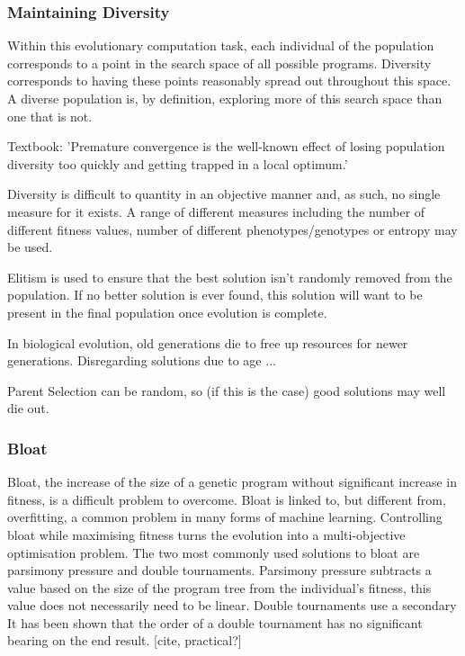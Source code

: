 \documentclass{article}
\begin{document}

\subsubsection{Maintaining Diversity}
Within this evolutionary computation task, each individual of the population corresponds to a point in the search space of all possible programs. %
Diversity corresponds to having these points reasonably spread out throughout this space. A diverse population is, by definition, exploring more of this search space than one that is not. %

Textbook: 'Premature convergence is the well-known effect of losing population diversity too quickly and getting trapped in a local optimum.'

Diversity is difficult to quantity in an objective manner and, as such, no single measure for it exists. A range of different measures including the number of different fitness values, number of different phenotypes/genotypes or entropy may be used\cite{textbook}.

Elitism is used to ensure that the best solution isn't randomly removed from the population. If no better solution is ever found, this solution will want to be present in the final population once evolution is complete.

In biological evolution, old generations die to free up resources for newer generations.
Disregarding solutions due to age ... %

Parent Selection can be random, so (if this is the case) good solutions may well die out.

\subsubsection{Bloat}
Bloat, the increase of the size of a genetic program without significant increase in fitness, is a difficult problem to overcome. Bloat is linked to, but different from, overfitting, a common problem in many forms of machine learning\cite{overfitting_bloat}. Controlling bloat while maximising fitness turns the evolution into a multi-objective optimisation problem. The two most commonly used solutions to bloat are parsimony pressure and double tournaments. Parsimony pressure subtracts a value based on the size of the program tree from the individual's fitness, this value does not necessarily need to be linear. %
Double tournaments use a secondary 
It has been shown that the order of a double tournament has no significant bearing on the end result. [cite, practical?]
\end{document}
